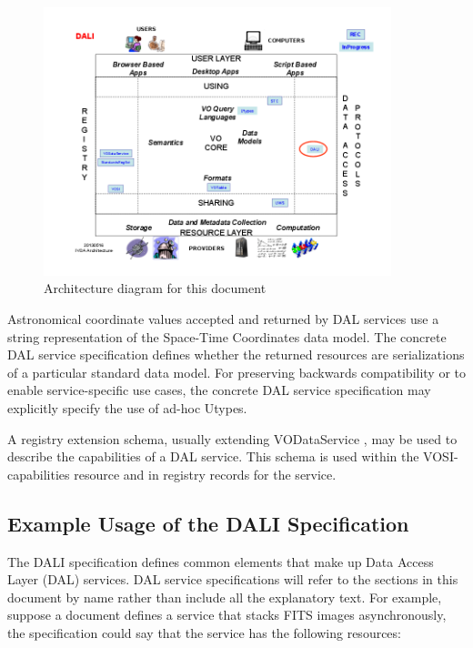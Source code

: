 \documentclass[11pt,letter]{ivoa}
\begin{document}
\begin{figure}
\centering


\includegraphics[width=0.9\textwidth]{archdiag.png}
\caption{Architecture diagram for this document}
\label{fig:archdiag}
\end{figure}

Astronomical coordinate values accepted and returned by DAL services use a 
string representation of the Space-Time Coordinates \citep{std:STC} data 
model. The 
concrete DAL service specification defines whether the returned resources are 
serializations of a particular standard data model. For preserving backwards 
compatibility or to enable service-specific use cases, the concrete DAL service 
specification may explicitly specify the use of ad-hoc Utypes.

A registry extension schema, usually extending VODataService \citep{std:VODS11}, 
may be used to 
describe the capabilities of a DAL service. This schema is used within the 
VOSI-capabilities \citep{std:VOSI} resource and in registry records for the 
service.

\subsection{Example Usage of the DALI Specification}
The DALI specification defines common elements that make up Data Access Layer 
(DAL) services. DAL service specifications will refer to the sections in this 
document by name rather than include all the explanatory text. For example, 
suppose a document defines a service that stacks FITS images asynchronously, the 
specification could say that the service has the following resources:
\end{document}
